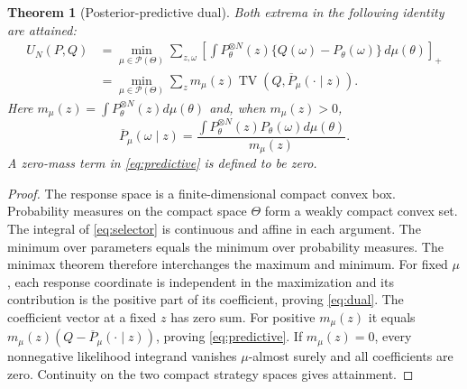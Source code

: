 \documentclass[11pt]{amsart}
\newtheorem{theorem}{Theorem}[section]
\theoremstyle{definition}\newtheorem{definition}[theorem]{Definition}
\theoremstyle{remark}\newtheorem{remark}[theorem]{Remark}
\newcommand{\TV}{\operatorname{TV}}
\newcommand{\1}{\mathbf 1}
\newcommand{\cP}{\mathcal P}
\begin{document}
\begin{theorem}[Posterior-predictive dual]\label{thm:dual}
Both extrema in the following identity are attained:
\begin{align}
 U_N(P,Q)
 &=\min_{\mu\in\cP(\Theta)}
   \sum_{z,\omega}
   \left[\int P_\theta^{\otimes N}(z)
               \{Q(\omega)-P_\theta(\omega)\}\,d\mu(\theta)\right]_+
                                                        \label{eq:dual}\\
 &=\min_{\mu\in\cP(\Theta)}
   \sum_z m_\mu(z)\TV(Q,\overline P_\mu(\cdot\mid z)).
                                                        \label{eq:predictive}
\end{align}
Here $m_\mu(z)=\int P_\theta^{\otimes N}(z)d\mu(\theta)$ and, when
$m_\mu(z)>0$,
\[
 \overline P_\mu(\omega\mid z)
 =\frac{\int P_\theta^{\otimes N}(z)P_\theta(\omega)d\mu(\theta)}
        {m_\mu(z)}.
\]
A zero-mass term in \eqref{eq:predictive} is defined to be zero.
\end{theorem}
\begin{proof}
The response space is a finite-dimensional compact convex box.
Probability measures on the compact space $\Theta$ form a weakly compact
convex set. The integral of \eqref{eq:selector} is continuous and affine
in each argument. The minimum over parameters equals the minimum over
probability measures. The minimax theorem \cite{Sion} therefore interchanges
the maximum and minimum. For fixed $\mu$, each response coordinate is
independent in the maximization and its contribution is the positive part
of its coefficient, proving \eqref{eq:dual}. The coefficient vector at a
fixed $z$ has zero sum. For positive $m_\mu(z)$ it equals
$m_\mu(z)(Q-\overline P_\mu(\cdot\mid z))$, proving
\eqref{eq:predictive}. If $m_\mu(z)=0$, every nonnegative likelihood
integrand vanishes $\mu$-almost surely and all coefficients are zero.
Continuity on the two compact strategy spaces gives attainment.
\end{proof}
\end{document}
